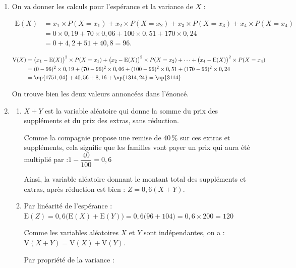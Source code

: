 	\begin{enumerate}
		\item On va donner les calculs pour l'espérance et la variance de $X$ :

		$\begin{aligned}
			\mathrm{E}(X)&= x_1 \times P(X = x_1) +x_2 \times P(X = x_2) +x_3 \times P(X = x_3) +x_4 \times P(X = x_4)\\
				&=0 \times 0,19 + 70 \times 0,06 + 100 \times 0,51 + 170  \times 0,24\\
				&= 0 + 4,2 + 51 + 40,8 = 96.
		\end{aligned}$

		$\begin{aligned}
			\mathrm{V}(X) & = \big(x_1-\mathrm{E}(X)\big)^2  \times P(X = x_1) + \big(x_2-\mathrm{E}(X)\big)^2 \times P(X = x_2) + \dots %
			 + \big(x_4-\mathrm{E}(X)\big)^2 \times P(X = x_4)\\
			&=(0 - 96)^2 \times 0,19 + (70-96)^2 \times 0,06 + (100 - 96)^2 \times 0,51 + (170-96)^2  \times 0,24\\
			&= \np{1751,04} + 40,56 + 8,16 + \np{1314,24}=\np{3114}
		\end{aligned}$

		On trouve bien les deux valeurs annoncées dans l'énoncé.

		\item \begin{enumerate}
			\item $X + Y$ est la variable aléatoire qui donne la somme du prix des suppléments et du prix des extras, sans réduction.

			Comme la compagnie propose une remise de 40\,\% sur ces extras et suppléments, cela signifie que les familles vont payer un prix qui aura été multiplié par :\quad $1 - \dfrac{40}{100} = 0,6$

			Ainsi, la variable aléatoire donnant le montant total des suppléments et extras, après réduction est bien : \quad $Z = 0,6(X + Y)$.

			\item Par linéarité de l'espérance :\quad $\mathrm{E}(Z)= 0,6 \big(\mathrm{E}(X) + \mathrm{E}(Y)\big) = 0,6\big(96 + 104\big) = 0,6 \times 200 = 120$

			Comme les variables aléatoires $X$ et $Y$ sont indépendantes, on a :\quad $\mathrm{V}(X + Y) = \mathrm{V}(X) + \mathrm{V}(Y)$.

			Par propriété de la variance :


\end{enumerate}
\end{enumerate}
